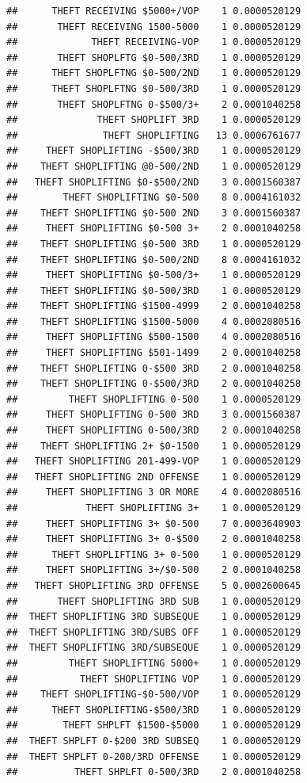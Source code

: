 \documentclass[]{book}
\begin{document}
\begin{verbatim}
##      THEFT RECEIVING $5000+/VOP    1 0.0000520129
##       THEFT RECEIVING 1500-5000    1 0.0000520129
##             THEFT RECEIVING-VOP    1 0.0000520129
##       THEFT SHOPLFTG $0-500/3RD    1 0.0000520129
##      THEFT SHOPLFTNG $0-500/2ND    1 0.0000520129
##      THEFT SHOPLFTNG $0-500/3RD    1 0.0000520129
##       THEFT SHOPLFTNG 0-$500/3+    2 0.0001040258
##              THEFT SHOPLIFT 3RD    1 0.0000520129
##               THEFT SHOPLIFTING   13 0.0006761677
##     THEFT SHOPLIFTING -$500/3RD    1 0.0000520129
##    THEFT SHOPLIFTING @0-500/2ND    1 0.0000520129
##   THEFT SHOPLIFTING $0-$500/2ND    3 0.0001560387
##        THEFT SHOPLIFTING $0-500    8 0.0004161032
##    THEFT SHOPLIFTING $0-500 2ND    3 0.0001560387
##     THEFT SHOPLIFTING $0-500 3+    2 0.0001040258
##    THEFT SHOPLIFTING $0-500 3RD    1 0.0000520129
##    THEFT SHOPLIFTING $0-500/2ND    8 0.0004161032
##     THEFT SHOPLIFTING $0-500/3+    1 0.0000520129
##    THEFT SHOPLIFTING $0-500/3RD    1 0.0000520129
##    THEFT SHOPLIFTING $1500-4999    2 0.0001040258
##    THEFT SHOPLIFTING $1500-5000    4 0.0002080516
##     THEFT SHOPLIFTING $500-1500    4 0.0002080516
##     THEFT SHOPLIFTING $501-1499    2 0.0001040258
##    THEFT SHOPLIFTING 0-$500 3RD    2 0.0001040258
##    THEFT SHOPLIFTING 0-$500/3RD    2 0.0001040258
##         THEFT SHOPLIFTING 0-500    1 0.0000520129
##     THEFT SHOPLIFTING 0-500 3RD    3 0.0001560387
##     THEFT SHOPLIFTING 0-500/3RD    2 0.0001040258
##    THEFT SHOPLIFTING 2+ $0-1500    1 0.0000520129
##   THEFT SHOPLIFTING 201-499-VOP    1 0.0000520129
##   THEFT SHOPLIFTING 2ND OFFENSE    1 0.0000520129
##     THEFT SHOPLIFTING 3 OR MORE    4 0.0002080516
##            THEFT SHOPLIFTING 3+    1 0.0000520129
##     THEFT SHOPLIFTING 3+ $0-500    7 0.0003640903
##     THEFT SHOPLIFTING 3+ 0-$500    2 0.0001040258
##      THEFT SHOPLIFTING 3+ 0-500    1 0.0000520129
##     THEFT SHOPLIFTING 3+/$0-500    2 0.0001040258
##   THEFT SHOPLIFTING 3RD OFFENSE    5 0.0002600645
##       THEFT SHOPLIFTING 3RD SUB    1 0.0000520129
##  THEFT SHOPLIFTING 3RD SUBSEQUE    1 0.0000520129
##  THEFT SHOPLIFTING 3RD/SUBS OFF    1 0.0000520129
##  THEFT SHOPLIFTING 3RD/SUBSEQUE    1 0.0000520129
##         THEFT SHOPLIFTING 5000+    1 0.0000520129
##           THEFT SHOPLIFTING VOP    1 0.0000520129
##    THEFT SHOPLIFTING-$0-500/VOP    1 0.0000520129
##      THEFT SHOPLIFTING-$500/3RD    1 0.0000520129
##        THEFT SHPLFT $1500-$5000    1 0.0000520129
##  THEFT SHPLFT 0-$200 3RD SUBSEQ    1 0.0000520129
##  THEFT SHPLFT 0-200/3RD OFFENSE    1 0.0000520129
##          THEFT SHPLFT 0-500/3RD    2 0.0001040258

\end{verbatim}
\end{document}
